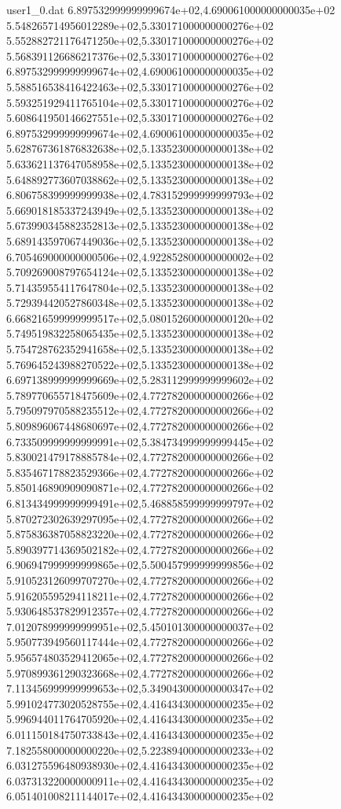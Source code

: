 \begin{filecontents}{user1_0.dat}
6.897532999999999674e+02,4.690061000000000035e+02
5.548265714956012289e+02,5.330171000000000276e+02
5.552882721176471250e+02,5.330171000000000276e+02
5.568391126686217376e+02,5.330171000000000276e+02
6.897532999999999674e+02,4.690061000000000035e+02
5.588516538416422463e+02,5.330171000000000276e+02
5.593251929411765104e+02,5.330171000000000276e+02
5.608641950146627551e+02,5.330171000000000276e+02
6.897532999999999674e+02,4.690061000000000035e+02
5.628767361876832638e+02,5.133523000000000138e+02
5.633621137647058958e+02,5.133523000000000138e+02
5.648892773607038862e+02,5.133523000000000138e+02
6.806758399999999938e+02,4.783152999999999793e+02
5.669018185337243949e+02,5.133523000000000138e+02
5.673990345882352813e+02,5.133523000000000138e+02
5.689143597067449036e+02,5.133523000000000138e+02
6.705469000000000506e+02,4.922852800000000002e+02
5.709269008797654124e+02,5.133523000000000138e+02
5.714359554117647804e+02,5.133523000000000138e+02
5.729394420527860348e+02,5.133523000000000138e+02
6.668216599999999517e+02,5.080152600000000120e+02
5.749519832258065435e+02,5.133523000000000138e+02
5.754728762352941658e+02,5.133523000000000138e+02
5.769645243988270522e+02,5.133523000000000138e+02
6.697138999999999669e+02,5.283112999999999602e+02
5.789770655718475609e+02,4.772782000000000266e+02
5.795097970588235512e+02,4.772782000000000266e+02
5.809896067448680697e+02,4.772782000000000266e+02
6.733509999999999991e+02,5.384734999999999445e+02
5.830021479178885784e+02,4.772782000000000266e+02
5.835467178823529366e+02,4.772782000000000266e+02
5.850146890909090871e+02,4.772782000000000266e+02
6.813434999999999491e+02,5.468858599999999797e+02
5.870272302639297095e+02,4.772782000000000266e+02
5.875836387058823220e+02,4.772782000000000266e+02
5.890397714369502182e+02,4.772782000000000266e+02
6.906947999999999865e+02,5.500457999999999856e+02
5.910523126099707270e+02,4.772782000000000266e+02
5.916205595294118211e+02,4.772782000000000266e+02
5.930648537829912357e+02,4.772782000000000266e+02
7.012078999999999951e+02,5.450101300000000037e+02
5.950773949560117444e+02,4.772782000000000266e+02
5.956574803529412065e+02,4.772782000000000266e+02
5.970899361290323668e+02,4.772782000000000266e+02
7.113456999999999653e+02,5.349043000000000347e+02
5.991024773020528755e+02,4.416434300000000235e+02
5.996944011764705920e+02,4.416434300000000235e+02
6.011150184750733843e+02,4.416434300000000235e+02
7.182558000000000220e+02,5.223894000000000233e+02
6.031275596480938930e+02,4.416434300000000235e+02
6.037313220000000911e+02,4.416434300000000235e+02
6.051401008211144017e+02,4.416434300000000235e+02

\end{filecontents}
